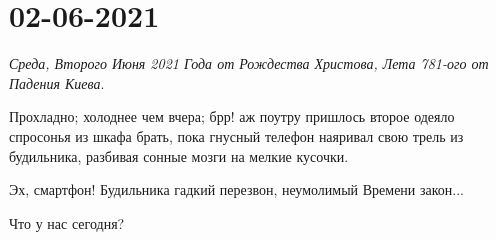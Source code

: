  
 
 
 
 
\section{02-06-2021}

\emph{Среда, Второго Июня 2021 Года от Рождества Христова, Лета 781-ого от Падения Киева}.

Прохладно; холоднее чем вчера; брр! аж поутру пришлось второе одеяло спросонья
из шкафа брать, пока гнусный телефон наяривал свою трель из будильника,
разбивая сонные мозги на мелкие кусочки.

Эх, смартфон! Будильника гадкий перезвон, неумолимый Времени закон...

Что у нас сегодня?
